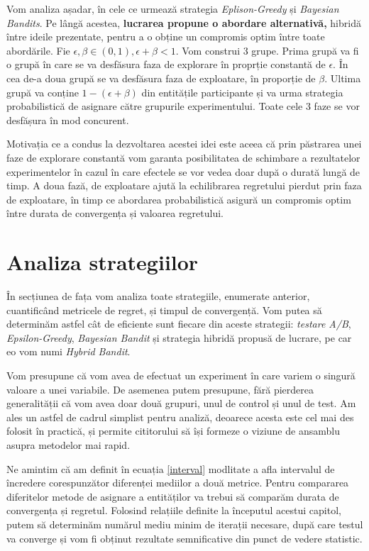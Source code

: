 Vom analiza așadar, în cele ce urmează strategia \textit{Eplison-Greedy} și \textit{Bayesian Bandits}. Pe lângă acestea, \textbf{lucrarea propune o abordare alternativă,} hibridă între ideile prezentate, pentru a o obține un compromis optim între toate abordările. Fie $\epsilon, \beta \in(0, 1), \epsilon + \beta < 1$. Vom construi 3 grupe. Prima grupă va fi o grupă în care se va desfăsura faza de explorare în proprție constantă de $\epsilon$. În cea de-a doua grupă se va desfăsura faza de exploatare, în proporție de $\beta$. Ultima grupă va conține $1 - (\epsilon + \beta)$ din entitățile participante și va urma strategia probabilistică de asignare către grupurile experimentului. Toate cele 3 faze se vor desfășura în mod concurent.

Motivația ce a condus la dezvoltarea acestei idei este aceea că prin păstrarea unei faze de explorare constantă vom garanta posibilitatea de schimbare a rezultatelor experimentelor în cazul în care efectele se vor vedea doar după o durată lungă de timp. A doua fază, de exploatare ajută la echilibrarea regretului pierdut prin faza de exploatare, în timp ce abordarea probabilistică asigură un compromis optim între durata de convergența și valoarea regretului.

\section{Analiza strategiilor}

În secțiunea de fața vom analiza toate strategiile, enumerate anterior, cuantificând metricele de regret, și timpul de convergență. Vom putea să determinăm astfel cât de eficiente sunt fiecare din aceste strategii: \textit{testare A/B}, \textit{Epsilon-Greedy}, \textit{Bayesian Bandit} și strategia hibridă propusă de lucrare, pe car eo vom numi \textit{Hybrid Bandit}. 

Vom presupune că vom avea de efectuat un experiment în care variem o singură valoare a unei variabile. De asemenea putem presupune, fără pierderea generalității că vom avea doar două grupuri, unul de control și unul de test. Am ales un astfel de cadrul simplist pentru analiză, deoarece acesta este cel mai des folosit în practică, și permite cititorului să își formeze o viziune de ansamblu asupra metodelor mai rapid. 

Ne amintim că am definit în ecuația \ref{interval} modlitate a afla intervalul de încredere corespunzător diferenței mediilor a două metrice. Pentru compararea diferitelor metode de asignare a entităților va trebui să comparăm durata de convergența și regretul. Folosind relațiile definite la începutul acestui capitol, putem să determinăm numărul mediu minim de iterații necesare, după care testul va converge și vom fi obținut rezultate semnificative din punct de vedere statistic. 

